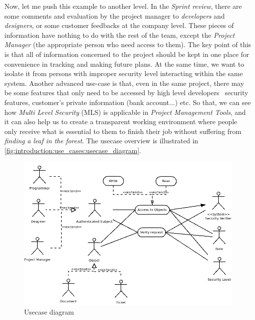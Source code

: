 Now, let me push this example to another level. In the \emph{Sprint review}, there are some comments and evaluation by the project manager to \emph{developers} and \emph{designers}, or some customer feedbacks at the company level.
These pieces of information have nothing to do with the rest of the team, except the \emph{Project Manager} (\ie the appropriate person who need access to them).
The key point of this is that all of information concerned to the project should be kept in one place for convenience in tracking and making future plans.
At the same time, we want to isolate it from persons with improper security level interacting within the same system.
Another advanced use-case is that, even in the same project, there may be some features that only need to be accessed by high level developers \eg\, security features, customer's private information (bank account...) etc.
So that, we can see how \emph{Multi Level Security} (MLS) is applicable in \emph{Project Management Tools}, and it can also help us to create a transparent working environment where people only receive what is essential to them to finish their job without suffering from \emph{finding a leaf in the forest}.
The usecase overview is illustrated in \autoref{fig:introduction:use_cases:usecase_diagram}.

\begin{figure}[bth]
\myfloatalign
\includegraphics[width=1.0\linewidth]{gfx/chapter_1/usecase_diagram}
\caption[Usecase diagram]{Usecase diagram}\label{fig:introduction:use_cases:usecase_diagram}
\end{figure}

